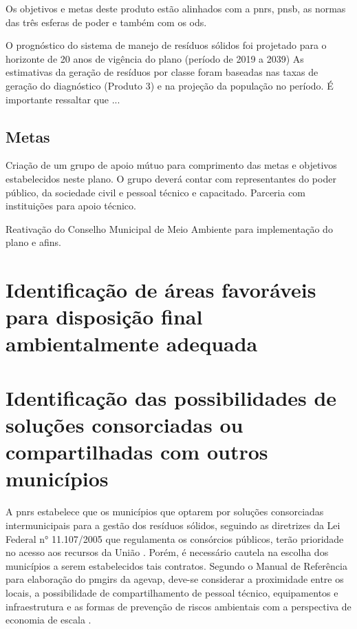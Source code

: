 \thispagestyle{headfootimage}

Os objetivos e metas deste produto estão alinhados com a \gls{pnrs}, \gls{pnsb}, as normas das três esferas de poder e também com os \gls{ods}.

O prognóstico do sistema de manejo de resíduos sólidos foi projetado para o horizonte de 20 anos de vigência do plano (período de 2019 a 2039) As estimativas da geração de resíduos por classe foram baseadas nas taxas de geração do diagnóstico (Produto 3) e na projeção da população no período. É importante ressaltar que ...

\subsection{Metas}
Criação de um grupo de apoio mútuo para comprimento das metas e objetivos estabelecidos neste plano. O grupo deverá contar com representantes do poder público, da sociedade civil e pessoal técnico e capacitado. Parceria com instituições para apoio técnico.

Reativação do Conselho Municipal de Meio Ambiente para implementação do plano e afins.


\newpage
\FloatBarrier
\section{Identificação de áreas favoráveis para disposição final ambientalmente adequada}
\label{sec:areas_fav}

\newpage
\FloatBarrier
\section{Identificação das possibilidades de soluções consorciadas ou compartilhadas com outros municípios}
\label{sec:sol_cons}



A \gls{pnrs} estabelece que os municípios que optarem por soluções consorciadas intermunicipais para a gestão dos resíduos sólidos, seguindo as diretrizes da Lei Federal n° 11.107/2005 que regulamenta os consórcios públicos, terão prioridade no acesso aos recursos da União \cite{brasil:12305}. Porém, é necessário cautela na escolha dos municípios a serem estabelecidos tais contratos. Segundo o Manual de Referência para elaboração do \gls{pmgirs} da \gls{agevap}, deve-se considerar a proximidade entre os locais, a possibilidade de compartilhamento de pessoal técnico, equipamentos e infraestrutura e as formas de prevenção de riscos ambientais com a perspectiva de economia de escala \cite{agevap_manual_2019}.

